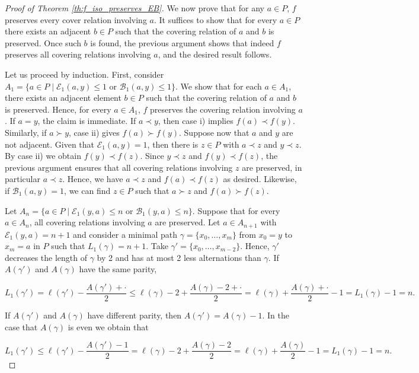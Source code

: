 \documentclass{article}[12pt]
\theoremstyle{exampstyle}
\theoremstyle{remark}
\newcommand{\B}{\mathcal{B}}
\newcommand{\E}{\mathcal{E}}
\newcommand{\tuple}[3][1]{#2_{#1}, \dots , #2_{#3}}
\begin{document}
\begin{proof}[Proof of Theorem \ref{th:f_iso_preserves_EB}]
    We now prove that for any $a \in P$, $f$ preserves every cover relation involving $a$. It suffices to show that for every $a \in P$ there exists an adjacent $b \in P$ such that the covering relation of $a$ and $b$ is preserved. Once such $b$ is found, the previous argument shows that indeed $f$ preserves all covering relations involving $a$, and the desired result follows.
    
    Let us proceed by induction. First, consider $A_1 = \{ a \in P \mid \E_1(a,y) \leq 1 \text{ or } \B_1(a,y) \leq 1\}$. We show that for each $a \in A_1$, there exists an adjacent element $b \in P$ such that the covering relation of $a$ and $b$ is preserved. Hence, for every $a \in A_1$, $f$ preserves the covering relation involving $a$. If $ a = y$, the claim is immediate. If $a \prec y$, then case i) implies $f(a) \prec f(y)$. Similarly, if $a \succ y$, case ii) gives $f(a) \succ f(y)$. Suppose now that $a$ and $y$ are not adjacent. Given that $\E_1(a,y) = 1$, then there is $z \in P$ with  $a \prec z$ and $y \prec z$. By case ii) we obtain $f(y) \prec f(z)$. Since $y \prec z$ and $f(y) \prec f(z)$, the previous argument ensures that all covering relations involving $z$ are preserved, in particular $a \prec z$. Hence, we have $a \prec z$ and $f(a) \prec f(z)$ as desired. Likewise, if $\B_1(a,y) = 1$, we can find $z \in P$ such that $a \succ z$ and $f(a) \succ f(z)$. 
    
    Let $A_n = \{ a \in P \mid \E_1(y,a) \leq n \text{ or } \B_1(y,a) \leq n\} $. Suppose that for every $a \in A_n$, all covering relations involving $a$ are preserved. Let $a \in A_{n+1}$ with $\E_1(y,a) = n+1$ and consider a minimal path $\gamma = \{ \tuple[0]{x}{m}\}$ from $x_0 = y$ to $x_m = a$ in $P$  such that $L_1(\gamma) = n + 1$. Take $\gamma' = \{ \tuple[0]{x}{m-2}\}$. Hence, $\gamma'$ decreases the length of $\gamma$ by 2 and has at most 2 less alternations than $\gamma$. If $A(\gamma')$ and $ A(\gamma)$  have the same parity,
    
    \[L_1(\gamma') = \ell(\gamma') - \frac{A(\gamma') + \cdot}{2} \leq   \ell(\gamma) - 2 + \frac{A(\gamma) - 2 + \cdot}{2} = \ell(\gamma) + \frac{A(\gamma) + \cdot}{2} - 1 = L_1(\gamma) - 1 = n.\]

    If $A(\gamma')$ and $ A(\gamma)$ have different parity, then $A(\gamma') = A(\gamma) - 1$. In the case that $A(\gamma)$ is even we obtain that 

    \[L_1(\gamma') \leq \ell(\gamma') - \frac{A(\gamma') -1}{2} =   \ell(\gamma) - 2 + \frac{A(\gamma) - 2}{2} = \ell(\gamma) + \frac{A(\gamma) }{2} - 1 = L_1(\gamma) - 1 = n.\]


\end{proof}
\end{document}
